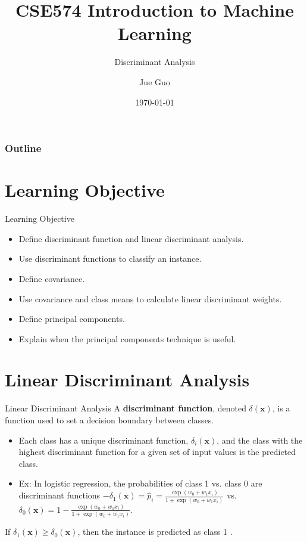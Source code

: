 \documentclass[10pt,dvipsnames]{beamer}
\title{CSE574 Introduction to Machine Learning}
\subtitle{Discriminant Analysis}
\author{Jue Guo}
\institute{University at Buffalo}
\date{\today}
\begin{document}
\begin{frame}
	\titlepage
\end{frame}
\begin{frame}
	\frametitle{Outline}
	\tableofcontents
\end{frame}

\section{Learning Objective}
\begin{frame}{Learning Objective}
	\begin{itemize}
		\item Define discriminant function and linear discriminant analysis.
		\item Use discriminant functions to classify an instance.
		\item Define covariance.
		\item Use covariance and class means to calculate linear discriminant weights.
		\item Define principal components.
		\item Explain when the principal components technique is useful.
	\end{itemize}
\end{frame}

\section{Linear Discriminant Analysis}
\begin{frame}{Linear Discriminant Analysis}
	A \textbf{discriminant function}, denoted \(\delta(\mathbf{x})\), is a function used to set a decision boundary between classes.
	\begin{itemize}
		\item Each class has a unique discriminant function, \(\delta_{i}(\mathbf{x})\), and the class with the highest discriminant function for a given set of input values is the predicted class.
		\item Ex: In logistic regression, the probabilities of class 1 vs. class 0 are discriminant functions \(-\delta_{1}(\mathbf{x})=\hat{p}_{i}=\frac{\exp \left(w_{0}+w_{1} x_{i}\right)}{1+\exp \left(w_{0}+w_{1} x_{i}\right)}\) vs.
		      \(\delta_{0}(\mathbf{x})=1-\frac{\exp \left(w_{0}+w_{1} x_{i}\right)}{1+\exp \left(w_{0}+w_{1} x_{i}\right)}\).
	\end{itemize}
	If \(\delta_{1}(\mathbf{x}) \geq \delta_{0}(\mathbf{x})\), then the instance is predicted as class 1 .
\end{frame}
\end{document}
